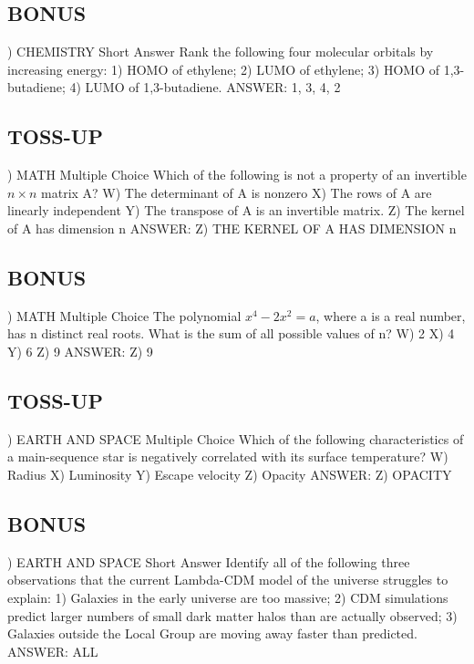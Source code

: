\documentclass{article}
\begin{document}
\subsection*{BONUS}
) CHEMISTRY Short Answer Rank the following four molecular orbitals by increasing energy: 1) HOMO of ethylene; 2) LUMO of ethylene; 3) HOMO of 1,3-butadiene; 4) LUMO of 1,3-butadiene.
\noindent ANSWER: 1, 3, 4, 2

\subsection*{TOSS-UP}
) MATH Multiple Choice Which of the following is not a property of an invertible $n\times n$ matrix A?
\noindent W) The determinant of A is nonzero
\noindent X) The rows of A are linearly independent
\noindent Y) The transpose of A is an invertible matrix.
\noindent Z) The kernel of A has dimension n
\noindent ANSWER: Z) THE KERNEL OF A HAS DIMENSION n

\subsection*{BONUS}
) MATH Multiple Choice The polynomial $x^{4}-2x^{2}=a$, where a is a real number, has n distinct real roots. What is the sum of all possible values of n?
\noindent W) 2
\noindent X) 4
\noindent Y) 6
\noindent Z) 9
\noindent ANSWER: Z) 9

\subsection*{TOSS-UP}
) EARTH AND SPACE Multiple Choice Which of the following characteristics of a main-sequence star is negatively correlated with its surface temperature?
\noindent W) Radius
\noindent X) Luminosity
\noindent Y) Escape velocity
\noindent Z) Opacity
\noindent ANSWER: Z) OPACITY

\subsection*{BONUS}
) EARTH AND SPACE Short Answer Identify all of the following three observations that the current Lambda-CDM model of the universe struggles to explain: 1) Galaxies in the early universe are too massive; 2) CDM simulations predict larger numbers of small dark matter halos than are actually observed; 3) Galaxies outside the Local Group are moving away faster than predicted.
\noindent ANSWER: ALL
\end{document}
